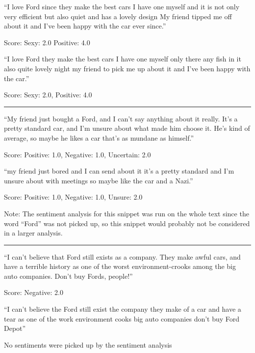 \documentclass[a4paper,12pt,twoside]{ltxdoc}
\newcommand*\sepline{%
  \begin{center}
    \rule[1ex]{.5\textwidth}{.5pt}
  \end{center}}
\begin{document}
\begin{center}
``I love Ford since they make the best cars I have one myself and it is not only very efficient but also quiet and has a lovely design My friend tipped me off about it and I've been happy with the car ever since.''
\end{center}
\hfill Score: Sexy: 2.0 Positive: 4.0

\begin{center}
``I love Ford they make the best cars I have one myself only there any fish in it also quite lovely night my friend to pick me up about it and I've been happy with the car.''
\end{center}
\hfill Score: Sexy: 2.0, Positive: 4.0

\sepline

\begin{center}
``My friend just bought a Ford, and I can't say anything about it really. It's a pretty standard car, and I'm unsure about what made him choose it. He's kind of average, so maybe he likes a car that's as mundane as himself.''
\end{center}
\hfill Score: Positive: 1.0, Negative: 1.0, Uncertain: 2.0

\begin{center}
``my friend just bored and I can send about it it's a pretty standard and I'm unsure about with meetings so maybe like the car and a Nazi.''
\end{center}
\hfill Score: Positive: 1.0, Negative: 1.0, Unsure: 2.0

Note: The sentiment analysis for this snippet was run on the whole text since the word ``Ford'' was not picked up, so this snippet would probably not be considered in a larger analysis.

\sepline

\begin{center}
``I can't believe that Ford still exists as a company. They make awful cars, and have a terrible history as one of the worst environment-crooks among the big auto companies. Don't buy Fords, people!''
\end{center}
\hfill Score: Negative: 2.0

\begin{center}
``I can't believe the Ford still exist the company they make of a car and have a tear as one of the work environment cooks big auto companies don't buy Ford Depot''
\end{center}
\hfill No sentiments were picked up by the sentiment analysis
\end{document}
